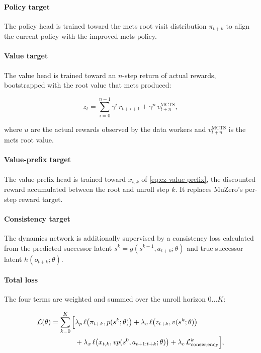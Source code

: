 \paragraph{Policy target}
The policy head is trained toward the \gls{mcts} root visit distribution $\pi_{t+k}$
to align the current policy with the improved \gls{mcts} policy.

\paragraph{Value target}
The value head is trained toward an $n$-step return of actual rewards,
bootstrapped with the root value that \gls{mcts} produced:

\begin{equation}\label{eq:ez-value-target}
  z_t=\sum_{i=0}^{n-1}\gamma^{i}\,r_{t+i+1}+\gamma^{n}\,v^{\text{MCTS}}_{t+n},
\end{equation}

where $u$ are the actual rewards observed by the data workers and
$v^{\text{MCTS}}_{t+n}$ is the \gls{mcts} root value.

\paragraph{Value-prefix target}
The value-prefix head is trained toward $x_{t,k}$ of \cref{eq:ez-value-prefix},
the discounted reward accumulated between the root and unroll step $k$.
It replaces MuZero's per-step reward target.

\paragraph{Consistency target}
The dynamics network is additionally supervised by a consistency loss
calculated from the predicted successor latent $s^k=g(s^{k-1},a_{t+k};\theta)$
and true successor latent $h(o_{t+k};\theta)$.

\paragraph{Total loss}
The four terms are weighted and summed over the unroll horizon $0\dots K$:

\begin{equation}\label{eq:ez-loss}
  \begin{split}
    \mathcal{L}(\theta)=\sum_{k=0}^{K}\Big[
      &\lambda_p\,\ell\!\left(\pi_{t+k},p(s^k;\theta)\right)
       + \lambda_v\,\ell\!\left(z_{t+k},v(s^k;\theta)\right)\\
      &+ \lambda_x\,\ell\!\left(x_{t,k},\mathit{vp}(s^0,a_{t+1:t+k};\theta)\right)
       + \lambda_c\,\mathcal{L}^k_{\text{consistency}}\Big],
  \end{split}
\end{equation}

